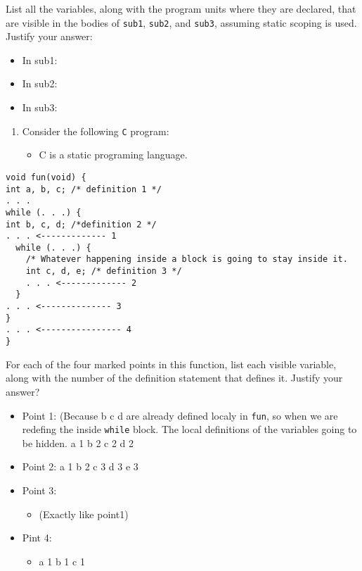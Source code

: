 \documentclass[11pt]{article}
\begin{document}
List all the variables, along with the program units where they are declared,
that are visible in the bodies of \texttt{sub1}, \texttt{sub2}, and \texttt{sub3}, assuming
static scoping is used. Justify your answer:

\begin{itemize}
\item In sub1:

\item In sub2:

\item In sub3:
\end{itemize}


\begin{enumerate}
\item Consider the following \texttt{C} program:

\begin{itemize}
\item C is a static programing language.
\end{itemize}
\end{enumerate}

\begin{verbatim}
void fun(void) {
int a, b, c; /* definition 1 */
. . .
while (. . .) {
int b, c, d; /*definition 2 */
. . . <------------- 1
  while (. . .) {
    /* Whatever happening inside a block is going to stay inside it.
    int c, d, e; /* definition 3 */
    . . . <------------- 2
  }
. . . <-------------- 3
}
. . . <---------------- 4
}
\end{verbatim}

For each of the four marked points in this function, list each visible variable,
along with the number of the definition statement that defines it. Justify your
answer?


\begin{itemize}
\item Point 1: (Because b c d are already defined localy in \texttt{fun}, so when we are
redefing the inside \texttt{while} block. The local definitions of the variables
going to be hidden.
a 1
b 2
c 2
d 2
\item Point 2:
a 1
b 2
c 3
d 3
e 3
\item Point 3:
\begin{itemize}
\item (Exactly like point1)
\end{itemize}
\item Pint 4:
\begin{itemize}
\item a 1 b 1 c 1
\end{itemize}
\end{itemize}
\end{document}
